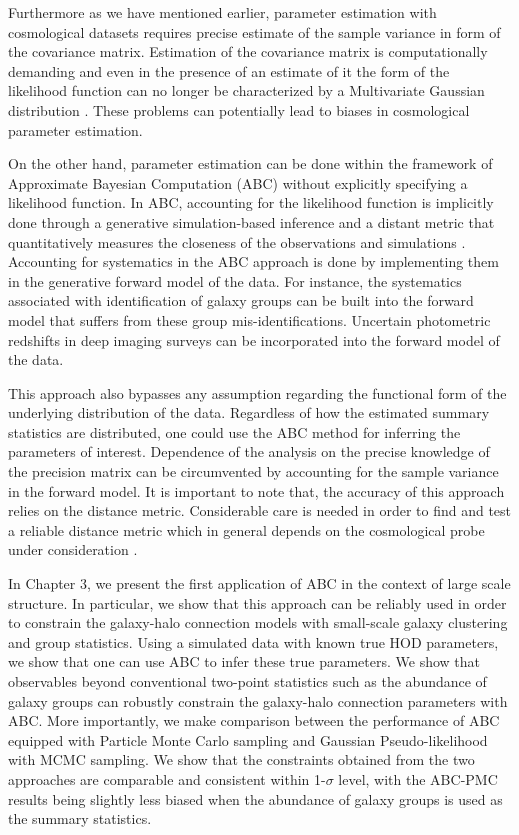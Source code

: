 Furthermore as we have mentioned earlier, parameter estimation with cosmological datasets requires precise estimate of 
the sample variance in form of the covariance matrix. Estimation of the covariance matrix is computationally demanding \citep{chuang2015,harnois} and even 
in the presence of an estimate of it the form of the likelihood function can no longer be characterized by a Multivariate Gaussian distribution \citep{Sellentin:2016a,Sellentin:2017a}.
These problems can potentially lead to biases in cosmological parameter estimation.

On the other hand, parameter estimation can be done within the framework of Approximate Bayesian Computation (ABC) without explicitly 
specifying a likelihood function. In ABC, accounting for the likelihood function is implicitly done through a 
generative simulation-based inference and a distant metric that quantitatively 
measures the closeness of the observations and simulations \citep{optimalkernel,abcpmc}. Accounting for systematics in the ABC approach is done by implementing 
them in the generative forward model of the data. For instance, the systematics associated with identification of galaxy groups can be built into the forward model that suffers from these group mis-identifications. Uncertain photometric redshifts in deep imaging surveys can be incorporated into the forward model of the data.   

This approach also bypasses any assumption regarding the functional form of the underlying distribution of the data. Regardless of how the estimated summary statistics are 
distributed, one could use the ABC method for inferring the parameters of interest.
Dependence of the analysis on the precise knowledge of the precision matrix can be circumvented by accounting for the sample variance 
in the forward model. It is important to note that, the accuracy of this approach relies on the distance metric. Considerable care is needed in order to find and test a reliable distance metric which in general depends on the cosmological probe under consideration \citep{abcsn,abcwl,jennings2016a,jennings2016b}. 

In Chapter 3, we present the first application of ABC in the context of large scale structure. In particular, we show that this approach can be reliably used in order to constrain 
the galaxy-halo connection models with small-scale galaxy clustering and group statistics. Using a simulated data with known true HOD parameters, we show that one can use ABC to infer these true parameters. We show that observables beyond conventional two-point statistics such as the abundance of galaxy groups can robustly constrain the galaxy-halo connection parameters with ABC. More importantly, we make comparison between the performance of ABC equipped with Particle Monte Carlo sampling and Gaussian Pseudo-likelihood with MCMC sampling. We show that the constraints obtained from the two approaches are comparable and consistent within 1-$\sigma$ level, with the ABC-PMC results being slightly less 
biased when the abundance of galaxy groups is used as the summary statistics. 

